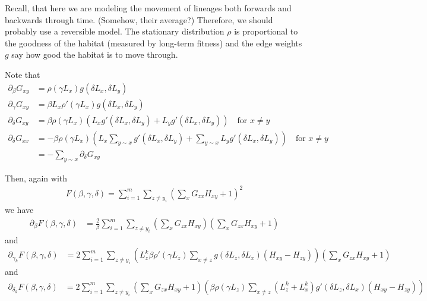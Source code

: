 \documentclass{article}
\begin{document}
Recall, that here we are modeling the movement of lineages both forwards and backwards through time.
(Somehow, their average?)
Therefore, we should probably use a reversible model.
The stationary distribution $\rho$ is proportional to the goodness of the habitat
(measured by long-term fitness)
and the edge weights $g$ say how good the habitat is to move through.

Note that
\begin{align}
  \partial_\beta G_{xy} &= \rho( \gamma L_x ) g( \delta L_x, \delta L_y ) \\
  \partial_\gamma G_{xy} &= \beta L_x \rho'( \gamma L_x ) g( \delta L_x, \delta L_y ) \\
  \partial_\delta G_{xy} &= \beta \rho( \gamma L_x ) \left( L_x g'( \delta L_x, \delta L_y )  + L_y g'( \delta L_x, \delta L_y ) \right ) 
      \quad \text{for } x \neq y \\
  \partial_\delta G_{xx} &=  - \beta \rho( \gamma L_x ) \left( L_x \sum_{y \sim x} g'(\delta L_x, \delta L_y) + \sum_{y \sim x} L_y g'( \delta L_x, \delta L_y ) \right) \quad \text{for } x \neq y \\
      &= - \sum_{y \sim x} \partial_\delta G_{xy} 
\end{align}

Then, again with
\begin{align}
  F(\beta,\gamma,\delta) = \sum_{i=1}^m \sum_{z \neq y_i} \left( \sum_x G_{zx} H_{xy} + 1 \right)^2 
\end{align}
we have
\begin{align}
    \partial_\beta F(\beta,\gamma,\delta) &= \frac{2}{\beta} \sum_{i=1}^m \sum_{z \neq y_i} \left( \sum_x G_{zx} H_{xy} \right)\left( \sum_x G_{zx} H_{xy} + 1 \right)
\end{align}
and
\begin{align}
  \partial_{\gamma_k} F(\beta,\gamma,\delta) &= 2 \sum_{i=1}^m \sum_{z \neq y_i} \left( L^k_z \beta \rho'(\gamma L_z) \sum_{x \neq z} g(\delta L_z, \delta L_x) (H_{xy}-H_{zy}) \right) \left( \sum_x G_{zx} H_{xy} + 1 \right)  
\end{align}
and
\begin{align}
  \partial_{\delta_k} F(\beta,\gamma,\delta) &= 2 \sum_{i=1}^m \sum_{z \neq y_i} 
    \left( \sum_x G_{zx} H_{xy} + 1 \right) 
  \left( \beta \rho(\gamma L_z) 
    \sum_{x \neq z} (L^k_z + L^k_x) g'(\delta L_z, \delta L_x) ( H_{xy} - H_{zy} ) 
  \right) 
\end{align}
\end{document}
